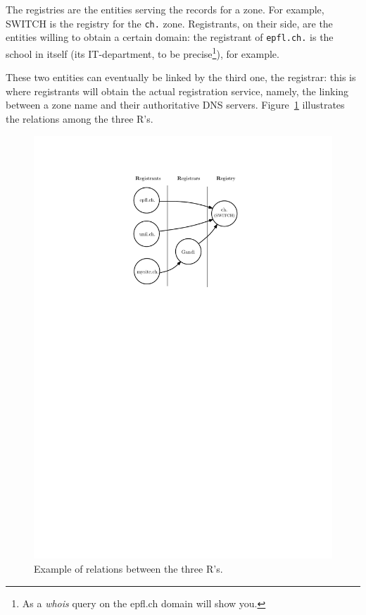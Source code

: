 \documentclass[a4paper,twocolumn]{scrartcl}
\begin{document}
The registries are the entities serving the records for a zone. For example, SWITCH is the registry for the \verb|ch.| zone. Registrants, on their side, are the entities willing to obtain a certain domain: the registrant of \verb|epfl.ch.| is the school in itself (its IT-department, to be precise\footnote{As a \emph{whois} query on the epfl.ch domain will show you.}), for example.

These two entities can eventually be linked by the third one, the registrar: this is where registrants will obtain the actual registration service, namely, the linking between a zone name and their authoritative DNS servers. Figure~\ref{fig:3Rs} illustrates the relations among the three R's.

\begin{figure}
\center
  \includegraphics[width=\linewidth]{3Rs}
  \caption{Example of relations between the three R's.}
  \label{fig:3Rs}
\end{figure}
\end{document}
